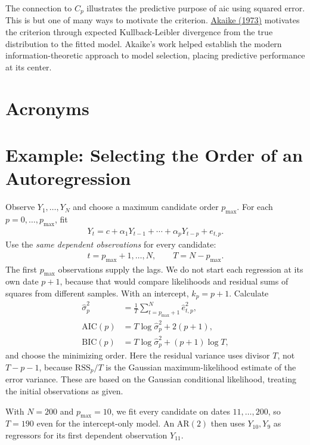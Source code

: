\documentclass[a4paper,12pt]{article}
\begin{document}
\begin{remark}
	The connection to $C_p$ illustrates the predictive purpose of \gls{aic} using squared error.
	This is but one of many ways to motivate the criterion.
	\href{https://doi.org/10.1007/978-1-4612-1694-0_15}{Akaike (1973)} motivates the criterion
	through expected Kullback-Leibler divergence from the true distribution to the fitted model.
	Akaike's work helped establish the modern information-theoretic approach to model selection,
	placing predictive performance at its center.
\end{remark}

\vfill
\section*{Acronyms}
\printglossaries

\clearpage
\appendix

\section{Example: Selecting the Order of an Autoregression}

Observe $Y_1,\ldots,Y_N$ and choose a maximum candidate order $p_{\max}$.
For each $p=0,\ldots,p_{\max}$, fit
\begin{align}
	Y_t=c+\alpha_1Y_{t-1}+\cdots+\alpha_pY_{t-p}+e_{t,p}.
\end{align}
Use the \emph{same dependent observations} for every candidate:
\begin{align}
	t=p_{\max}+1,\ldots,N,
	\qquad T=N-p_{\max}.
\end{align}
The first $p_{\max}$ observations supply the lags.
We do not start each regression at its own date $p+1$,
because that would compare likelihoods and residual sums of squares from different samples.
With an intercept, $k_p=p+1$.
Calculate
\begin{align}
	\widehat\sigma_p^2
	&=\frac1T\sum_{t=p_{\max}+1}^N\widehat e_{t,p}^2,\\
	\mathrm{AIC}(p)&=T\log\widehat\sigma_p^2+2(p+1),\\
	\mathrm{BIC}(p)&=T\log\widehat\sigma_p^2+(p+1)\log T,
\end{align}
and choose the minimizing order.
Here the residual variance uses divisor $T$, not $T-p-1$,
because $\mathrm{RSS}_p/T$ is the Gaussian maximum-likelihood estimate of the error variance.
These are based on the Gaussian conditional likelihood, treating the initial observations as given.

\begin{example}
	With $N=200$ and $p_{\max}=10$, we fit every candidate on dates $11,\ldots,200$,
	so $T=190$ even for the intercept-only model.
	An $\mathrm{AR}(2)$ then uses $Y_{10},Y_9$ as regressors for its first dependent observation $Y_{11}$.
\end{example}
\end{document}
